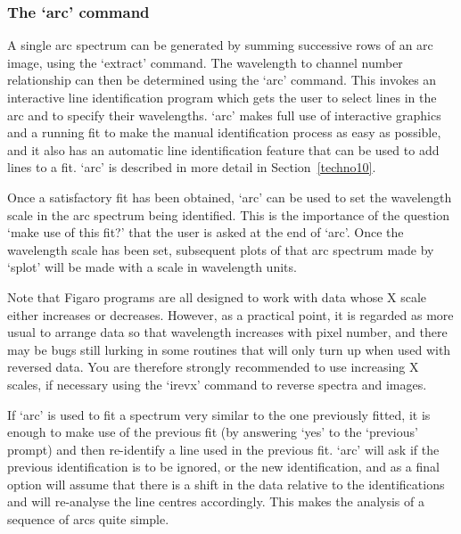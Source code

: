 \documentclass[11pt,twoside]{article}
\newcommand{\htmlref}[2]{#1}
\newcommand{\latorhtm}[2]{#1}
\newcommand{\latorhtm}[2]{#2}
\begin{document}

\subsubsection{\label{techno8arc}The `arc' command}

   A single arc spectrum can be generated by summing successive rows of
   an arc image, using the `extract' command.  The wavelength to channel
   number relationship can then be determined using the `arc' command.
   This invokes an interactive line identification program which gets
   the user to select lines in the arc and to specify their wavelengths.
   `arc' makes full use of interactive graphics and a running fit to
   make the manual identification process as easy as possible, and it
   also has an automatic line identification feature that can be used to
   add lines to a fit.
   \latorhtm{`arc' is described in more detail in Section~\ref{techno10}.}
   {\htmlref{`arc' is described in more detail in its own section.}{techno10}}

   Once a satisfactory fit has been obtained, `arc' can be used to set
   the wavelength scale in the arc spectrum being identified.  This is
   the importance of the question `make use of this fit?' that the user
   is asked at the end of `arc'.  Once the wavelength scale has been
   set, subsequent plots of that arc spectrum made by `splot' will be
   made with a scale in wavelength units.

   Note that Figaro programs are all designed to work with data whose X
   scale either increases or decreases.  However, as a practical point,
   it is regarded as more usual to arrange data so that wavelength
   increases with pixel number, and there may be bugs still lurking in
   some routines that will only turn up when used with reversed data.
   You are therefore strongly recommended to use increasing X scales, if
   necessary using the `irevx' command to reverse spectra and images.

   If `arc' is used to fit a spectrum very similar to the one previously
   fitted, it is enough to make use of the previous fit (by answering
   `yes' to the `previous' prompt) and then re-identify a line used in
   the previous fit.  `arc' will ask if the previous identification is
   to be ignored, or the new identification, and as a final option will
   assume that there is a shift in the data relative to the
   identifications and will re-analyse the line centres accordingly.
   This makes the analysis of a sequence of arcs quite simple.
\end{document}
